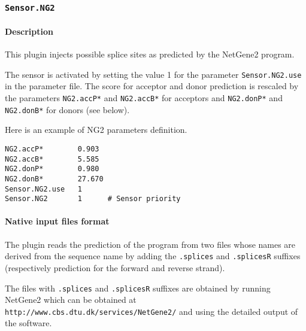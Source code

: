 
\subsubsection{\texttt{Sensor.NG2}}

\paragraph{Description}

This plugin injects possible splice sites as predicted by the
NetGene2 program. 

The sensor is activated by setting the value 1 for the parameter
\texttt{Sensor.NG2.use} in the parameter file. The score for acceptor
and donor prediction is rescaled by the parameters {\tt NG2.accP*} and
{\tt NG2.accB*} for acceptors and {\tt NG2.donP*} and {\tt NG2.donB*} for
donors (see below).

Here is an example of NG2 parameters definition.
\begin{Verbatim}[fontsize=\small]
NG2.accP*        0.903
NG2.accB*        5.585
NG2.donP*        0.980
NG2.donB*        27.670
Sensor.NG2.use   1
Sensor.NG2       1      # Sensor priority
\end{Verbatim}

\paragraph{Native input files format}
The plugin reads the prediction of the
program from two files whose names are derived from the sequence name
by adding the \texttt{.splices} and \texttt{.splicesR} suffixes
(respectively prediction for the forward and reverse strand).

The files with \texttt{.splices} and \texttt{.splicesR} suffixes are
obtained by running NetGene2 which can be obtained at
\texttt{http://www.cbs.dtu.dk/services/NetGene2/} and using the
detailed output of the software.

